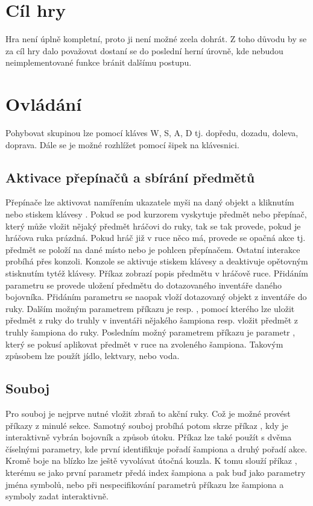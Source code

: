 
\section{Cíl hry}
Hra není úplně kompletní, proto ji není možné zcela dohrát. Z toho důvodu by se za cíl 
hry dalo považovat dostaní se do poslední herní úrovně, kde nebudou neimplementované funkce
bránit dalšímu postupu.

\section{Ovládání}
Pohybovat skupinou lze pomocí kláves W, S, A, D tj. dopředu, dozadu, doleva, doprava. Dále se je možné rozhlížet pomocí šipek na klávesnici.

\subsection{Aktivace přepínačů a sbírání předmětů}
Přepínače lze aktivovat namířením ukazatele myši na daný objekt a kliknutím nebo stiskem klávesy . Pokud
se pod kurzorem vyskytuje předmět nebo  přepínač, který může vložit nějaký předmět hráčovi do ruky, tak se tak provede, pokud je
hráčova ruka prázdná. Pokud hráč již v ruce něco má, provede se opačná akce tj. předmět se položí na dané místo nebo je 
pohlcen přepínačem. Ostatní interakce probíhá přes konzoli. Konzole se aktivuje stiskem klávesy  a deaktivuje opětovným
stisknutím tytéž klávesy. Příkaz  zobrazí popis předmětu v hráčově ruce. Přidáním parametru  se provede
uložení předmětu do dotazovaného inventáře daného bojovníka. Přidáním parametru  se naopak vloží dotazovaný objekt z inventáře
do ruky. Dalším možným parametrem příkazu je  resp. , pomocí kterého lze uložit předmět z ruky do
truhly v inventáři nějakého šampiona resp. vložit předmět z truhly šampiona do ruky. Posledním možný parametrem příkazu  je
parametr , který se pokusí aplikovat předmět v ruce na zvoleného šampiona. Takovým způsobem lze použít jídlo, lektvary, nebo voda.

\subsection{Souboj}
Pro souboj je nejprve nutné vložit zbraň to akční ruky. Což je možné provést příkazy z minulé sekce.
Samotný souboj probíhá potom skrze příkaz , kdy je interaktivně vybrán bojovník a způsob útoku.
Příkaz lze také použít s dvěma číselnými parametry, kde první identifikuje pořadí šampiona a druhý pořadí akce.
Kromě boje na blízko lze ještě vyvolávat útočná kouzla. K tomu slouží příkaz , kterému se jako první parametr předá index šampiona a pak buď
jako parametry jména symbolů, nebo při nespecifikování parametrů příkazu lze šampiona a symboly zadat interaktivně.

